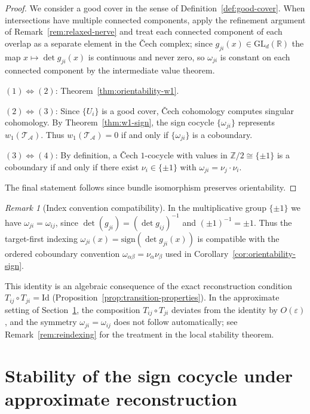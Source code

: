 \documentclass[11pt]{article}
\newcommand{\R}{\mathbb{R}}
\newcommand{\Z}{\mathbb{Z}}
\newcommand{\GL}{\mathrm{GL}}
\theoremstyle{plain}
\theoremstyle{definition}
\theoremstyle{remark}
\newtheorem{remark}[theorem]{Remark}
\begin{document}
\begin{proof}
We consider a good cover in the sense of Definition~\ref{def:good-cover}. When intersections have multiple connected components, apply the refinement argument of Remark~\ref{rem:relaxed-nerve} and treat each connected component of each overlap as a separate element in the \v{C}ech complex; since $g_{ji}(x) \in \GL_d(\R)$ the map $x \mapsto \det g_{ji}(x)$ is continuous and never zero, so $\omega_{ji}$ is constant on each connected component by the intermediate value theorem.

$(1) \Leftrightarrow (2)$: Theorem~\ref{thm:orientability-w1}.

$(2) \Leftrightarrow (3)$: Since $\{U_i\}$ is a good cover, \v{C}ech cohomology computes singular cohomology. By Theorem~\ref{thm:w1-sign}, the sign cocycle $\{\omega_{ji}\}$ represents $w_1(\mathcal{T}_{\mathcal{A}})$. Thus $w_1(\mathcal{T}_{\mathcal{A}}) = 0$ if and only if $\{\omega_{ji}\}$ is a coboundary.

$(3) \Leftrightarrow (4)$: By definition, a \v{C}ech $1$-cocycle with values in $\Z/2 \cong \{\pm 1\}$ is a coboundary if and only if there exist $\nu_i \in \{\pm 1\}$ with $\omega_{ji} = \nu_j \cdot \nu_i$.

The final statement follows since bundle isomorphism preserves orientability.
\end{proof}

\begin{remark}[Index convention compatibility]\label{rem:index-compatibility}
In the multiplicative group $\{\pm 1\}$ we have $\omega_{ji} = \omega_{ij}$, since $\det(g_{ji}) = (\det g_{ij})^{-1}$ and $(\pm 1)^{-1} = \pm 1$. Thus the target-first indexing $\omega_{ji}(x) = \mathrm{sign}(\det g_{ji}(x))$ is compatible with the ordered coboundary convention $\omega_{\alpha\beta} = \nu_\alpha \nu_\beta$ used in Corollary~\ref{cor:orientability-sign}.
 
This identity is an algebraic consequence of the exact reconstruction condition $T_{ij} \circ T_{ji} = \mathrm{Id}$ (Proposition~\ref{prop:transition-properties}). In the approximate setting of Section~\ref{sec:stability}, the composition $T_{ij} \circ T_{ji}$ deviates from the identity by $O(\varepsilon)$, and the symmetry $\omega_{ji} = \omega_{ij}$ does not follow automatically; see Remark~\ref{rem:reindexing} for the treatment in the local stability theorem.
\end{remark}


\section{Stability of the sign cocycle under approximate reconstruction}\label{sec:stability}
\end{document}
